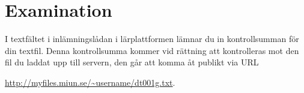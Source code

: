 \documentclass[a4paper]{miunasgn}
\begin{document}
\section{Examination}
\label{sec:Examination}
\noindent
I textfältet i inlämningslådan i lärplattformen lämnar du in kontrollsumman för 
din textfil.
Denna kontrollsumma kommer vid rättning att kontrolleras mot den fil du laddat 
upp till servern, den går att komma åt publikt via URL
\begin{center}
	\url{http://myfiles.miun.se/~username/dt001g.txt}.
\end{center}



\end{document}
